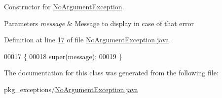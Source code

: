Constructor for \hyperlink{classpkg__exceptions_1_1NoArgumentException}{No\-Argument\-Exception}. 


\begin{DoxyParams}{Parameters}
{\em message} & Message to display in case of that error \\
\hline
\end{DoxyParams}


Definition at line \hyperlink{NoArgumentException_8java_source_l00017}{17} of file \hyperlink{NoArgumentException_8java_source}{No\-Argument\-Exception.\-java}.


\begin{DoxyCode}
00017                                               \{
00018         super(message);
00019     \}
\end{DoxyCode}


The documentation for this class was generated from the following file\-:\begin{DoxyCompactItemize}
\item 
pkg\-\_\-exceptions/\hyperlink{NoArgumentException_8java}{No\-Argument\-Exception.\-java}\end{DoxyCompactItemize}
